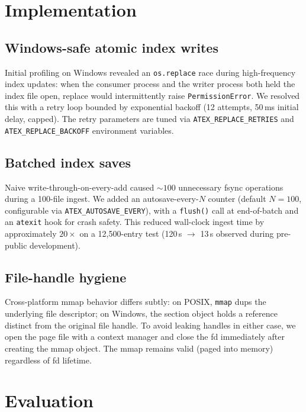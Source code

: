 \documentclass[10pt,letterpaper]{article}
\begin{document}
\section{Implementation}
\label{sec:impl}

\subsection{Windows-safe atomic index writes}

Initial profiling on Windows revealed an \texttt{os.replace} race during high-frequency index updates: when the consumer process and the writer process both held the index file open, replace would intermittently raise \texttt{PermissionError}. We resolved this with a retry loop bounded by exponential backoff (12 attempts, 50\,ms initial delay, capped). The retry parameters are tuned via \texttt{ATEX\_REPLACE\_RETRIES} and \texttt{ATEX\_REPLACE\_BACKOFF} environment variables.

\subsection{Batched index saves}

Naive write-through-on-every-add caused $\sim 100$ unnecessary fsync operations during a 100-file ingest. We added an autosave-every-$N$ counter (default $N = 100$, configurable via \texttt{ATEX\_AUTOSAVE\_EVERY}), with a \texttt{flush()} call at end-of-batch and an \texttt{atexit} hook for crash safety. This reduced wall-clock ingest time by approximately $20\times$ on a 12{,}500-entry test (120\,s $\to$ 13\,s observed during pre-public development).

\subsection{File-handle hygiene}

Cross-platform mmap behavior differs subtly: on POSIX, \texttt{mmap} dups the underlying file descriptor; on Windows, the section object holds a reference distinct from the original file handle. To avoid leaking handles in either case, we open the page file with a context manager and close the fd immediately after creating the mmap object. The mmap remains valid (paged into memory) regardless of fd lifetime.

\section{Evaluation}
\label{sec:eval}
\end{document}
